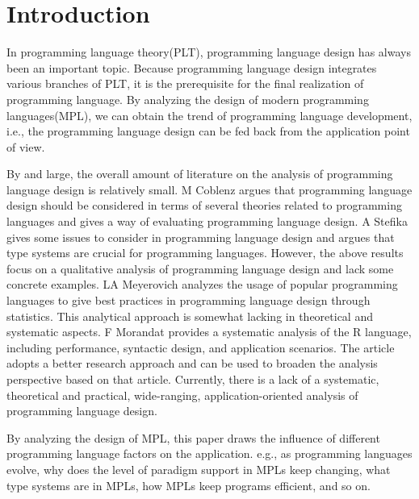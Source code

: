 \section{Introduction}

In programming language theory(PLT), programming language design has always been an important topic. Because programming language design integrates various branches of PLT, it is the prerequisite for the final realization of programming language. By analyzing the design of modern programming languages(MPL), we can obtain the trend of programming language development, i.e., the programming language design can be fed back from the application point of view.

By and large, the overall amount of literature on the analysis of
programming language design is relatively small.
M Coblenz argues that programming language design should be
considered in terms of several theories related to programming
languages and gives a way of evaluating programming language
design\cite{coblenz2018interdisciplinary}.
A Stefika gives some issues to consider in programming language
design and argues that type systems are crucial for
programming languages\cite{stefik2014programming}.
However, the above results focus on a qualitative analysis of
programming language design and lack some concrete examples.
LA Meyerovich analyzes the usage of popular programming languages
to give best practices in programming language design
through statistics\cite{meyerovich2013empirical}.
This analytical approach is somewhat lacking in theoretical and
systematic aspects.
F Morandat provides a systematic analysis of the R language,
including performance, syntactic design, and application
scenarios\cite{morandat2012evaluating}.
The article adopts a better research approach and can be used to
broaden the analysis perspective based on that article.
Currently, there is a lack of a systematic, theoretical and
practical, wide-ranging, application-oriented analysis of
programming language design.

By analyzing the design of MPL, this paper draws the influence of different programming language factors on the application. e.g., as programming languages evolve, why does the level of paradigm support in MPLs keep changing, what type systems are in MPLs, how MPLs keep programs efficient, and so on.